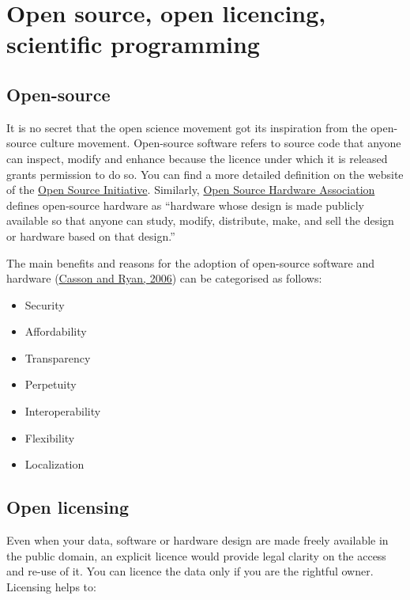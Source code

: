\documentclass[
]{book}
\providecommand{\tightlist}{%
  \setlength{\itemsep}{0pt}\setlength{\parskip}{0pt}}
\begin{document}
\hypertarget{open-source-open-licencing-scientific-programming}{%
\chapter{Open source, open licencing, scientific programming}\label{open-source-open-licencing-scientific-programming}}

\hypertarget{open-source}{%
\section{Open-source}\label{open-source}}

It is no secret that the open science movement got its inspiration from the open-source culture movement. Open-source software refers to source code that anyone can inspect, modify and enhance because the licence under which it is released grants permission to do so. You can find a more detailed definition on the website of the \href{https://opensource.org/osd}{Open Source Initiative}. Similarly, \href{https://www.oshwa.org/definition/}{Open Source Hardware Association} defines open-source hardware as ``hardware whose design is made publicly available so that anyone can study, modify, distribute, make, and sell the design or hardware based on that design.''

The main benefits and reasons for the adoption of open-source software and hardware (\href{https://www.researchgate.net/publication/228296692_Open_Standards_Open_Source_Adoption_in_the_Public_Sector_and_Their_Relationship_to_Microsoft's_Market_Dominance}{Casson and Ryan, 2006}) can be categorised as follows:

\begin{itemize}
\tightlist
\item
  Security
\item
  Affordability
\item
  Transparency
\item
  Perpetuity
\item
  Interoperability
\item
  Flexibility
\item
  Localization
\end{itemize}

\hypertarget{open-licensing}{%
\section{Open licensing}\label{open-licensing}}

Even when your data, software or hardware design are made freely available in the public domain, an explicit licence would provide legal clarity on the access and re-use of it. You can licence the data only if you are the rightful owner. Licensing helps to:
\end{document}
